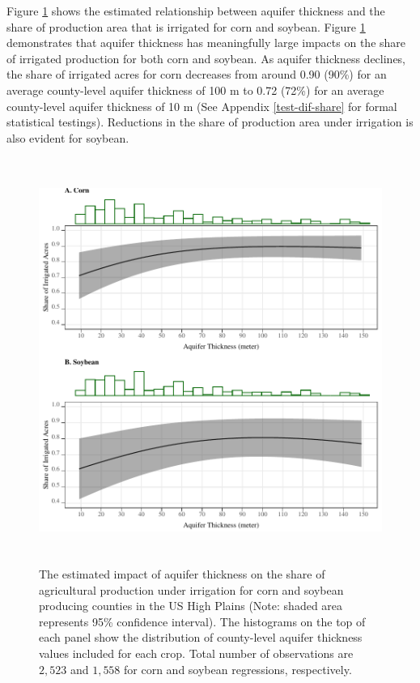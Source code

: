 \documentclass[
]{article}
\begin{document}
Figure \ref{fig:ir-share} shows the estimated relationship between aquifer thickness and the share of production area that is irrigated for corn and soybean. Figure \ref{fig:ir-share} demonstrates that aquifer thickness has meaningfully large impacts on the share of irrigated production for both corn and soybean. As aquifer thickness declines, the share of irrigated acres for corn decreases from around 0.90 (90\%) for an average county-level aquifer thickness of 100 m to 0.72 (72\%) for an average county-level aquifer thickness of 10 m (See Appendix \ref{test-dif-share} for formal statistical testings). Reductions in the share of production area under irrigation is also evident for soybean.

\begin{figure}[H]

{\centering \includegraphics[width=6in,height=500px,]{../../Figures/g_share} 

}

\caption{The estimated impact of aquifer thickness on the share of agricultural production under irrigation for corn and soybean producing counties in the US High Plains (Note: shaded area represents 95\% confidence interval). The histograms on the top of each panel show the distribution of county-level aquifer thickness values included for each crop. Total number of observations are $2,523$ and $1,558$ for corn and soybean regressions, respectively.}\label{fig:ir-share}
\end{figure}
\end{document}
